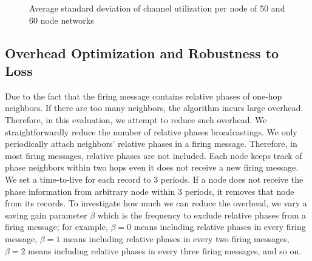 \begin{figure}[!t]
{	
}
\caption{Average standard deviation of channel utilization per node of 50 and 60 node networks}
\label{fig:period-fairness-50-60}
\lofcont
\end{figure}


\subsection{Overhead Optimization and Robustness to Loss}
Due to the fact that the firing message contains relative phases of one-hop neighbors. If there are too many neighbors, the algorithm incurs large overhead. Therefore, in this evaluation, we attempt to reduce such overhead. We straightforwardly reduce the number of relative phases broadcastings. We only periodically attach neighbors' relative phases in a firing message. Therefore, in most firing messages, relative phases are not included. 
Each node keeps track of phase neighbors within two hops even it does not receive a new firing message. We set a time-to-live for each record to 3 periods. If a node does not receive the phase information from arbitrary node within 3 periods, it removes that node from its records.
To investigate how much we can reduce the overhead, we vary a saving gain parameter $\beta$ which is the frequency to exclude relative phases from a firing message; for example, $\beta  = 0$ means including relative phases in every firing message, $\beta = 1$ means including relative phases in every two firing messages, $\beta = 2$ means including relative phases in every three firing messages, and so on. 

